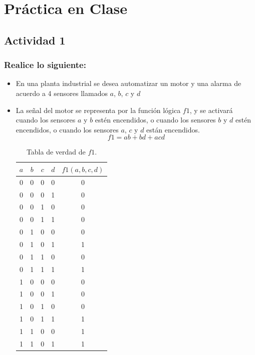 \section{Práctica en Clase}

\subsection{Actividad 1}

\subsubsection{Realice lo siguiente:}
\begin{itemize}
    \item En una planta industrial se desea automatizar un motor y una alarma de acuerdo a 4 sensores llamados $a$, $b$, $c$ y $d$ 
    \item La señal del motor se representa por la función lógica $f1$, y se activará  cuando los sensores $a$ y $b$ estén encendidos, o cuando los sensores $b$ y $d$ estén encendidos, o cuando los sensores $a$, $c$ y $d$ están encendidos.
    \begin{equation*}
        f1 = ab + bd + acd
    \end{equation*}
    \begin{table}[H]
    \centering
    \caption{Tabla de verdad de $f1$.}
    \label{tab:tv_f1}
    \begin{tabular}{ccccc}
        \toprule
        $a$ & $b$ & $c$ & $d$ & $f1(a,b,c,d)$ \\
        \midrule
        0 & 0 & 0 & 0 & 0 \\
        0 & 0 & 0 & 1 & 0 \\
        0 & 0 & 1 & 0 & 0 \\
        0 & 0 & 1 & 1 & 0 \\
        0 & 1 & 0 & 0 & 0 \\
        0 & 1 & 0 & 1 & 1 \\
        0 & 1 & 1 & 0 & 0 \\
        0 & 1 & 1 & 1 & 1 \\
        1 & 0 & 0 & 0 & 0 \\
        1 & 0 & 0 & 1 & 0 \\
        1 & 0 & 1 & 0 & 0 \\
        1 & 0 & 1 & 1 & 1 \\
        1 & 1 & 0 & 0 & 1 \\
        1 & 1 & 0 & 1 & 1 \\

\end{tabular}
\end{table}
\end{itemize}
